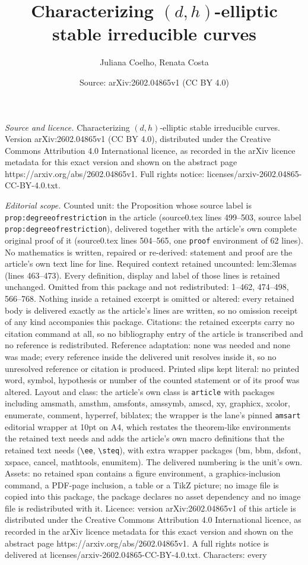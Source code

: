 \documentclass[10pt,a4paper]{amsart}
\title[Characterizing $(d,h)$-elliptic stable irreducible curves]{Characterizing $(d,h)$-elliptic stable irreducible curves}
\author{Juliana Coelho, Renata Costa}
\date{Source: arXiv:2602.04865v1 (CC BY 4.0)}
\begin{document}
\maketitle

\noindent\emph{Source and licence.} Characterizing $(d,h)$-elliptic stable irreducible curves. Version arXiv:2602.04865v1 (CC BY 4.0), distributed under the Creative Commons Attribution 4.0 International licence, as recorded in the arXiv licence metadata for this exact version and shown on the abstract page https://arxiv.org/abs/2602.04865v1. Full rights notice: licenses/arxiv-2602.04865-CC-BY-4.0.txt.\par\smallskip

\noindent\textit{Editorial scope.} Counted unit: the Proposition whose source label is \texttt{prop:degreeofrestriction} in the article (source0.tex lines 499--503, source label \texttt{prop:degreeofrestriction}), delivered together with the article's own complete original proof of it (source0.tex lines 504--565, one \texttt{proof} environment of 62 lines). No mathematics is written, repaired or re-derived: statement and proof are the article's own text line for line. Required context retained uncounted: lem:3lemas (lines 463--473). Every definition, display and label of those lines is retained unchanged. Omitted from this package and not redistributed: 1--462, 474--498, 566--768. Nothing inside a retained excerpt is omitted or altered: every retained body is delivered exactly as the article's lines are written, so no omission receipt of any kind accompanies this package. Citations: the retained excerpts carry no citation command at all, so no bibliography entry of the article is transcribed and no reference is redistributed. Reference adaptation: none was needed and none was made; every reference inside the delivered unit resolves inside it, so no unresolved reference or citation is produced. Printed slips kept literal: no printed word, symbol, hypothesis or number of the counted statement or of its proof was altered. Layout and class: the article's own class is \texttt{article} with packages including amsmath, amsthm, amsfonts, amssymb, amscd, xy, graphicx, xcolor, enumerate, comment, hyperref, biblatex; the wrapper is the lane's pinned \texttt{amsart} editorial wrapper at 10pt on A4, which restates the theorem-like environments the retained text needs and adds the article's own macro definitions that the retained text needs (\texttt{\textbackslash ee}, \texttt{\textbackslash steq}), with extra wrapper packages (bm, bbm, dsfont, xspace, cancel, mathtools, enumitem). The delivered numbering is the unit's own. Assets: no retained span contains a figure environment, a graphics-inclusion command, a PDF-page inclusion, a table or a TikZ picture; no image file is copied into this package, the package declares no asset dependency and no image file is redistributed with it. Licence: version arXiv:2602.04865v1 of this article is distributed under the Creative Commons Attribution 4.0 International licence, as recorded in the arXiv licence metadata for this exact version and shown on the abstract page https://arxiv.org/abs/2602.04865v1. A full rights notice is delivered at licenses/arxiv-2602.04865-CC-BY-4.0.txt. Characters: every 
\end{document}
